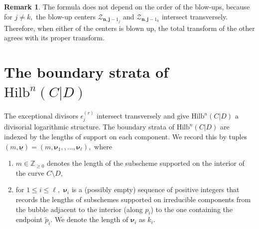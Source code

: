 \documentclass[10.5pt]{amsart}
\theoremstyle{definition}
\theoremstyle{definition}
\theoremstyle{definition}
\theoremstyle{definition}
\newtheorem{remark}[theorem]{Remark}
\newcommand{\Hilb}{\mathrm{Hilb}}
\newcommand{\cZ}{\mathcal{Z}}
\newcommand{\bi}{\boldsymbol{i}}
\begin{document}
\begin{remark}
    The formula does not depend on the order of the blow-ups, because for $j\neq k,$ the blow-up centers $\cZ_{\boldsymbol{n}, \boldsymbol{j}-1_j}$ and $\cZ_{\boldsymbol{n}, \boldsymbol{j}-1_k}$ intersect transversely. Therefore, when either of the centers is blown up, the total transform of the other agrees with its proper transform.
\end{remark}


\section{The boundary strata of $\Hilb^{{n}}{{(C|D)}}$}\label{subsec:strat}
The exceptional divisors $\epsilon_{j}^{(r)}$ intersect transversely and give $\Hilb^{n}(C|D)$ a divisorial logarithmic structure. The boundary strata of $\Hilb^{n}(C|D)$ are indexed by the lengths of support on each component. We record this by tuples $(m,\underline{\boldsymbol{\nu}})  = (m, \boldsymbol{\nu}_1, ,\dots ,\boldsymbol{\nu}_\ell),$ where \begin{enumerate}
    \item $m\in \mathbb{Z}_{\geq 0}$ denotes the length of the subscheme supported on the interior of the curve $C\setminus D,$
    \item for $1\leq i\leq \ell,$ $\boldsymbol{\nu}_i$ is a (possibly empty) sequence of positive integers that records the lengths of subschemes supported on irreducible components from the bubble adjacent to the interior (along $p_i$) to the one containing the endpoint $\tilde{p}_i$. We denote the length of $\boldsymbol{\nu}_i$ as $k_i.$ 
\end{enumerate}
\end{document}
